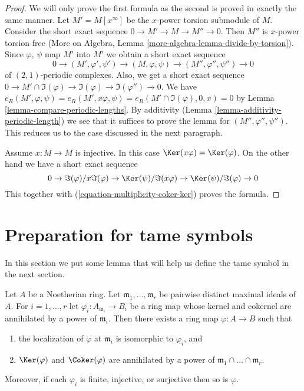 \begin{proof}
We will only prove the first formula as the second is proved
in exactly the same manner.
Let $M' = M[x^\infty]$ be the $x$-power torsion submodule of $M$.
Consider the short exact sequence $0 \to M' \to M \to M'' \to 0$.
Then $M''$ is $x$-power torsion free (More on Algebra, Lemma
\ref{more-algebra-lemma-divide-by-torsion}).
Since $\varphi$, $\psi$ map $M'$ into $M'$
we obtain a short exact sequence
$$
0 \to (M', \varphi', \psi') \to (M, \varphi, \psi) \to
(M'', \varphi'', \psi'') \to 0
$$
of $(2, 1)$-periodic complexes. Also, we get a short exact sequence
$0 \to M' \cap \Im(\varphi) \to \Im(\varphi) \to \Im(\varphi'') \to 0$.
We have
$e_R(M', \varphi, \psi) = e_R(M', x\varphi, \psi) =
e_R(M' \cap \Im(\varphi), 0, x) = 0$
by Lemma \ref{lemma-compare-periodic-lengths}.
By additivity (Lemma \ref{lemma-additivity-periodic-length})
we see that it suffices to prove the lemma for $(M'', \varphi'', \psi'')$.
This reduces us to the case discussed in the next paragraph.

\medskip\noindent
Assume $x : M \to M$ is injective.
In this case $\Ker(x\varphi) = \Ker(\varphi)$.
On the other hand we have a short exact sequence
$$
0 \to \Im(\varphi)/x\Im(\varphi) \to
\Ker(\psi)/\Im(x\varphi) \to \Ker(\psi)/\Im(\varphi) \to 0
$$
This together with (\ref{equation-multiplicity-coker-ker}) proves the formula.
\end{proof}







\section{Preparation for tame symbols}
\label{section-preparation-tame-symbol}

\noindent
In this section we put some lemma that will help us define the
tame symbol in the next section.

\begin{lemma}
\label{lemma-glue-at-max}
Let $A$ be a Noetherian ring. Let $\mathfrak m_1, \ldots, \mathfrak m_r$
be pairwise distinct maximal ideals of $A$. For $i = 1, \ldots, r$ let
$\varphi_i : A_{\mathfrak m_i} \to B_i$ be a ring map whose
kernel and cokernel are annihilated by a power
of $\mathfrak m_i$. Then there exists a ring map $\varphi : A \to B$ such
that
\begin{enumerate}
\item the localization of $\varphi$ at $\mathfrak m_i$ is
isomorphic to $\varphi_i$, and
\item $\Ker(\varphi)$ and $\Coker(\varphi)$ are annihilated
by a power of $\mathfrak m_1 \cap \ldots \cap \mathfrak m_r$.
\end{enumerate}
Moreover, if each $\varphi_i$ is finite, injective, or
surjective then so is $\varphi$.
\end{lemma}

